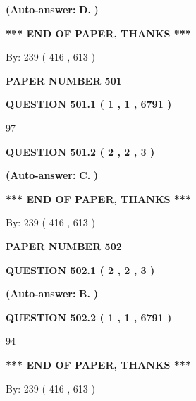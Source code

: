 \documentclass{ctexart}
\begin{document}
 
{\textbf{(Auto-answer:}}
{\textbf{\large{
D.}}}
{\textbf{)}}
 
 
   
   
   
   
\vspace{1.0in} 
{\textbf{\large{ *** END OF PAPER, THANKS *** }}} 
   
   
\hspace{1.0in} By: 
 239 ( 416 ,  613 )
   
   
   
   
\newpage 
\setcounter{page}{ 
   501001 } 
   
   
 {\textbf{ \Large{ PAPER NUMBER  501  }}}
   
   
   
   
  
  
{\textbf{\large{QUESTION
501.1 
 ( 1 , 1 , 6791 )
}}}

97
  
  
{\textbf{\large{QUESTION
501.2 
 ( 2 , 2 , 3 )
}}}
 
 
{\textbf{(Auto-answer:}}
{\textbf{\large{
C.}}}
{\textbf{)}}
 
 
   
   
   
   
\vspace{1.0in} 
{\textbf{\large{ *** END OF PAPER, THANKS *** }}} 
   
   
\hspace{1.0in} By: 
 239 ( 416 ,  613 )
   
   
   
   
\newpage 
\setcounter{page}{ 
   502001 } 
   
   
 {\textbf{ \Large{ PAPER NUMBER  502  }}}
   
   
   
   
  
  
{\textbf{\large{QUESTION
502.1 
 ( 2 , 2 , 3 )
}}}
 
 
{\textbf{(Auto-answer:}}
{\textbf{\large{
B.}}}
{\textbf{)}}
 
 
  
  
{\textbf{\large{QUESTION
502.2 
 ( 1 , 1 , 6791 )
}}}

94
   
   
   
   
\vspace{1.0in} 
{\textbf{\large{ *** END OF PAPER, THANKS *** }}} 
   
   
\hspace{1.0in} By: 
 239 ( 416 ,  613 )
   
   
   
\end{document}
